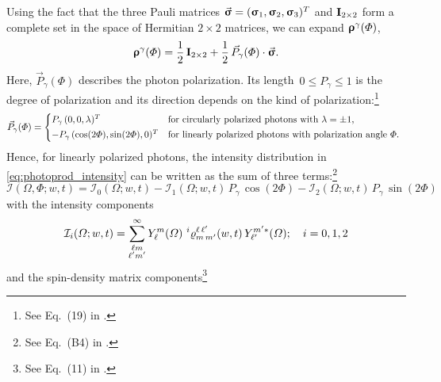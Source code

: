 Using the fact that the three Pauli matrices $\vec{\bm{\mathrm{\upsigma}}} =
(\bm{\mathrm{\upsigma}}_1, \bm{\mathrm{\upsigma}}_2, \bm{\mathrm{\upsigma}}_3)^T$ and
$\bm{\mathrm{I}}_{2 \times 2}$ form a complete set in the space of Hermitian
$2 \times 2$ matrices, we can expand $\bm{\mathrm{\upvarrho}}^\gamma(\Phi)$,
\ie
\begin{equation}
  \bm{\mathrm{\upvarrho}}^\gamma(\Phi)
  = \frac{1}{2}\, \bm{\mathrm{I}}_{2 \times 2} + \frac{1}{2}\, \vec{P}_\gamma(\Phi) \cdot \vec{\bm{\mathrm{\upsigma}}}.
\end{equation}
Here, $\vec{P}_\gamma(\Phi)$ describes the photon polarization.  Its
length~$0 \leq P_\gamma \leq 1$ is the degree of polarization and its
direction depends on the kind of polarization:\footnote{See Eq.~(19)
in .}
\begin{equation}
  \vec{P}_\gamma(\Phi)
  = \begin{cases*}
    P_\gamma\, (0, 0, \lambda)^T                & for circularly polarized photons with $\lambda = \pm 1$, \\
    -P_\gamma\, (\cos(2 \Phi), \sin(2 \Phi), 0)^T & for linearly polarized photons with polarization angle~$\Phi$.
  \end{cases*}
\end{equation}
Hence, for linearly polarized photons, the intensity distribution in
\cref{eq:photoprod_intensity} can be written as the sum of three
terms:\footnote{See Eq.~(B4) in .}
\begin{equation}
  \label{eq:photoprod_intensity_sum}
  \mathcal{I}(\Omega, \Phi; w, t)
  = \mathcal{I}_0(\Omega; w, t)
  - \mathcal{I}_1(\Omega; w, t)\, P_\gamma\, \cos(2 \Phi)
  - \mathcal{I}_2(\Omega; w, t)\, P_\gamma\, \sin(2 \Phi)
\end{equation}
with the intensity components
\begin{equation}
  \label{eq:photoprod_intensity_components}
  \mathcal{I}_i(\Omega; w, t)
  = \sum_{\substack{\ell m \\ \ell' m'}}^\infty
  Y_\ell^m(\Omega)\,
  \prescript{i}{}{\varrho}^{\ell\, \ell'}_{m\, m'}(w, t)\,
  Y_{\ell'}^{m' *}(\Omega);
  \quad i = 0, 1, 2
\end{equation}
and the spin-density matrix components\footnote{See Eq.~(11) in
.}
